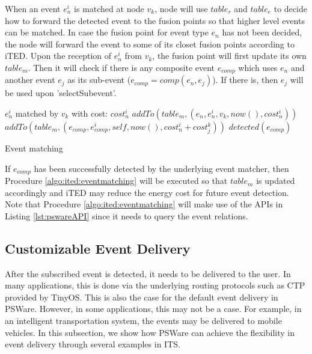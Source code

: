 When an event \(e_n^i\) is matched at node \(v_k\), node will use \(table_r\) and \(table_e\) to decide how to forward the detected event to the fusion points so that higher level events can be matched. In case the fusion point for event type \(e_n\) has not been decided, the node will forward the event to some of its closet fusion points  according to iTED. Upon the reception of \(e_n^i\) from \(v_k\), the fusion point will first update its own \(table_m\). Then it will check if there is any composite event \(e_{comp}\) which uses \(e_n\) and another event \(e_j\) as its sub-event (\(e_{comp}=comp(e_n, e_j)\)). If there is, then \(e_j\) will be used upon 'selectSubevent'.

\begin{algorithm}
\begin{algorithmic}
\REQUIRE \(e_n^i\) matched by \(v_k\) with cost: \(cost_n^i\)
	\STATE \(addTo(table_m, (e_n, e_n^i, v_k, now(), cost_n^i))\)
					\STATE \(addTo(table_m, (e_{comp}, e_{comp}^i, self, now(), cost_n^i+cost_j^k))\)
					\STATE \(detected(e_{comp})\)
				\ENDIF
			\ENDFOR
		\ENDIF
	\ENDFOR
\end{algorithmic}
\caption{Event matching}
\label{algo:ited:eventmatching}
\end{algorithm}

If \(e_{comp}\) has been successfully detected by the underlying event matcher, then Procedure \ref{algo:ited:eventmatching} will be executed so that \(table_m\) is updated accordingly and iTED may reduce the energy cost for future event detection. Note that Procedure \ref{algo:ited:eventmatching} will make use of the APIs in Listing \ref{lst:pswareAPI} since it needs to query the event relations.

\subsection{Customizable Event Delivery}
After the subscribed event is detected, it needs to be delivered to the user. In many applications, this is done via the underlying routing protocols such as CTP provided by TinyOS. This is also the case for the default event delivery in PSWare. However, in some applications, this may not be a case. For example, in an intelligent transportation system, the events may be delivered to mobile vehicles. In this subsection, we show how PSWare can achieve the flexibility in event delivery through several examples in ITS.

